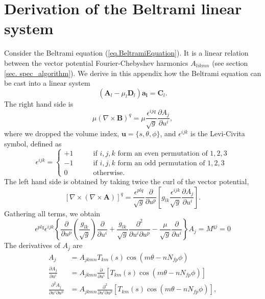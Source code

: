 \chapter{Derivation of the Beltrami linear system} \label{app. beltrami eq coef derivation}
Consider the Beltrami equation (\ref{eq.BeltramiEquation}). It is a linear relation between the vector potential Fourier-Chebyshev harmonics $A_{likmn}$ (see section \ref{sec. spec_algorithm}). We derive in this appendix how the Beltrami equation can be cast into a linear system
\begin{equation}
	\left(\mathbf{A}_l-\mu_l\mathbf{D}_l\right)\mathbf{a_l} = \mathbf{C}_l.
\end{equation}
The right hand side is
\begin{equation}
	\mu(\nabla\times\mathbf{B})^q = \mu\frac{\epsilon^{ijq}}{\sqrt{g}}\frac{\partial A_j}{\partial u^i},
\end{equation}
where we dropped the volume index, $\mathbf{u}=\{s,\theta,\phi\}$, and $\epsilon^{ijk}$ is the Levi-Civita symbol, defined as
\begin{equation}
	\epsilon^{ijk} = \begin{cases}
		+1 \qquad& \text{if $i,j,k$ form an even permutation of $1,2,3$}\\
		-1 \qquad& \text{if $i,j,k$ form an odd permutation of $1,2,3$}\\
		0  \qquad& \text{otherwise}.
	\end{cases}
\end{equation}
The left hand side is obtained by taking twice the curl of the vector potential,
\begin{equation}
	\left[\nabla\times(\nabla\times\mathbf{A})\right]^q = \frac{\epsilon^{plq}}{\sqrt{g}}\frac{\partial}{\partial u^p}\left[g_{lk}\frac{\epsilon^{ijk}}{\sqrt{g}}\frac{\partial A_j}{\partial u^i}\right].
\end{equation}
Gathering all terms, we obtain
\begin{equation}
	\epsilon^{plq}\epsilon^{ijk}\left\{\frac{\partial}{\partial u^p}\left(\frac{g_{lk}}{\sqrt{g}}\right)\frac{\partial}{\partial u^i}+\frac{g_{lk}}{\sqrt{g}}\frac{\partial^2}{\partial u^i\partial u^p} - \frac{\mu}{\sqrt{g}}\frac{\partial}{\partial u^i} \right\}A_j=M^{qj}=0
\end{equation}
The derivatives of $A_j$ are
\begin{align}
	A_j &= A_{jkmn} T_{km}(s)\cos(m\theta-nN_{fp}\phi)\\
	\frac{\partial A_j}{\partial u^i} &=  A_{jkmn} \frac{\partial}{\partial u^i}\left[T_{km}(s)\cos(m\theta-nN_{fp}\phi)\right]\\
	\frac{\partial^2 A_j}{\partial u^i\partial u^p} &=  A_{jkmn} \frac{\partial^2}{\partial u^i\partial u^p}\left[T_{km}(s)\cos(m\theta-nN_{fp}\phi)\right],
\end{align}
